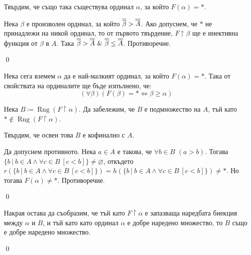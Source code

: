 \quad
Твърдим, че също така съществува ординал $\alpha$, за който $F(\alpha) = *$.
\begin{tcolorbox}[mybox={Доказателство:}]
\quad
Нека $\beta$ е произволен ординал, за който $\overline{\overline{\beta}} > \overline{\overline{A}}$.
Ако допуснем, че $*$ не принадлежи на никой ординал, то
от първото твърдение, $F \restriction \beta$ ще е инективна функция от $\beta$ в $A$.
Така $\overline{\overline{\beta}} > \overline{\overline{A}} \ \&\  \overline{\overline{\beta}} \leq \overline{\overline{A}}$. Противоречие.

\qed
\end{tcolorbox}

\quad
Нека сега вземем $\alpha$ да е най-малкият ординал, за който $F(\alpha) = *$.
Така от свойствата на ординалите ще бъде изпълнено, че:
\[
(\forall \beta)(F(\beta) = * \iff \beta \ge \alpha)
\]

\quad
Нека $B \coloneq \operatorname{Rng}(F \restriction \alpha)$.
Да забележим, че $B$ е подмножество на $A$, тъй като $* \notin \operatorname{Rng}(F \restriction \alpha)$.

\quad
Твърдим, че освен това $B$ е кофинално с $A$.
\begin{tcolorbox}[mybox={Доказателство:}]
\quad
Да допуснем противното.
Нека $a \in A$ е такова, че $\forall b \in B$ $(a > b)$.
Тогава $\{b\ |\ b \in A \land \forall c \in B \ [c < b] \} \neq \varnothing$,
откъдето $r(\{b\ |\ b \in A \land \forall c \in B \ [c < b] \}) = h(\{b\ |\ b \in A \land \forall c \in B \ [c < b] \}) \neq *$.
Но тогава $F(\alpha) \neq *$. Противоречие.

\qed
\end{tcolorbox}

\quad
Накрая остава да съобразим, че тъй като $F \restriction \alpha$ е запазваща наредбата биекция между $\alpha$ и $B$,
и тъй като като ординал $\alpha$ е добре наредено множество, то $B$ също е добре наредено множество.

\qed
